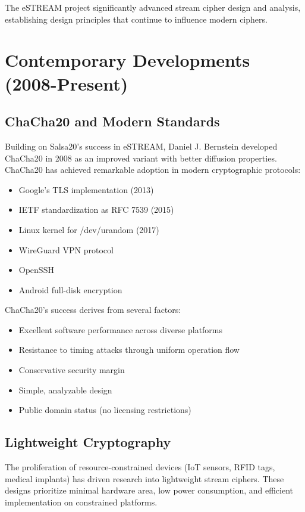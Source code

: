 \documentclass[12pt,a4paper,oneside]{report}
\begin{document}
The eSTREAM project significantly advanced stream cipher design and analysis, establishing design principles that continue to influence modern ciphers.

\section{Contemporary Developments (2008-Present)}
\label{sec:contemporary}

\subsection{ChaCha20 and Modern Standards}

Building on Salsa20's success in eSTREAM, Daniel J. Bernstein developed ChaCha20 in 2008 as an improved variant with better diffusion properties. ChaCha20 has achieved remarkable adoption in modern cryptographic protocols:

\begin{itemize}
    \item Google's TLS implementation (2013)
    \item IETF standardization as RFC 7539 (2015)
    \item Linux kernel for /dev/urandom (2017)
    \item WireGuard VPN protocol
    \item OpenSSH
    \item Android full-disk encryption
\end{itemize}

ChaCha20's success derives from several factors:

\begin{itemize}
    \item Excellent software performance across diverse platforms
    \item Resistance to timing attacks through uniform operation flow
    \item Conservative security margin
    \item Simple, analyzable design
    \item Public domain status (no licensing restrictions)
\end{itemize}

\subsection{Lightweight Cryptography}

The proliferation of resource-constrained devices (IoT sensors, RFID tags, medical implants) has driven research into lightweight stream ciphers. These designs prioritize minimal hardware area, low power consumption, and efficient implementation on constrained platforms.
\end{document}
